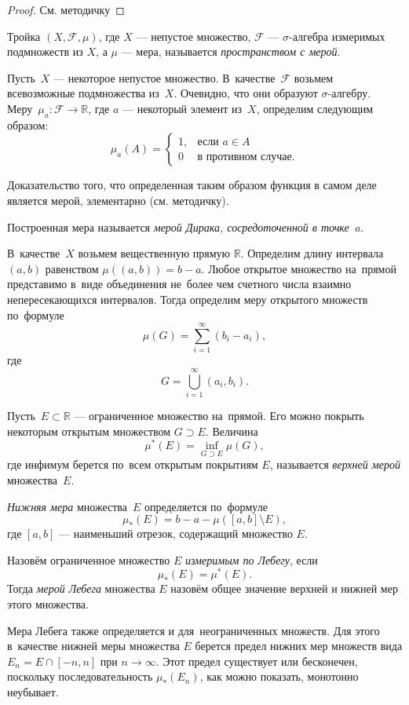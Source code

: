 \begin{proof}
    См. методичку
\end{proof}

\begin{definition}
    Тройка $(X, \mathcal F, \mu)$, где $X$ --- непустое множество, $\mathcal F$
    --- $\sigma$-алгебра измеримых подмножеств из $X$, а $\mu$ --- мера,
    называется \emph{пространством с мерой}.
\end{definition}

\begin{example}
    Пусть~$X$ --- некоторое непустое множество. В~качестве~$\mathcal F$
    возьмем всевозможные подмножества из~$X$. Очевидно, что они образуют
    $\sigma$-алгебру. Меру~$\mu_a \colon \mathcal F \to \mathbb R$, где 
    $a$ --- некоторый элемент из~$X$, определим следующим образом:
    \[ \mu_a(A) = 
        \begin{cases}
            1, & \text{если } a \in A \\
            0 & \text{в противном случае.}
    \end{cases} \]

    Доказательство того, что определенная таким образом функция в самом деле
    является мерой, элементарно (см. методичку).

    Построенная мера называется \emph{мерой Дирака, сосредоточенной в точке~$a$}.
\end{example}

\begin{example}
    В~качестве~$X$ возьмем вещественную прямую $\mathbb R$. Определим длину
    интервала~$(a, b)$ равенством $\mu( (a, b) ) = b - a$. Любое открытое
    множество на~прямой представимо в~виде объединения не~более чем счетного
    числа взаимно непересекающихся интервалов. Тогда определим меру
    открытого множеств по~формуле \[\mu(G) = \sum\limits_{i=1}^\infty (b_i -
    a_i),\] где 
    \[ G = \bigcup\limits_{i=1}^\infty (a_i, b_i). \]

    Пусть~$E \subset \mathbb R$ --- ограниченное множество на~прямой. Его можно
    покрыть некоторым открытым множеством $G \supset E$. Величина 
    \[ \mu^*(E) = \inf\limits_{G \supset E} \mu(G),\] 
    где инфимум берется по~всем открытым покрытиям
    $E$, называется \emph{верхней мерой} множества~$E$.

    \emph{Нижняя мера} множества~$E$ определяется по~формуле 
    \[ \mu_*(E) = b - a - \mu([a, b] \setminus E),\]
    где $[a, b]$ --- наименьший отрезок, содержащий множество $E$.

    Назовём ограниченное множество $E$ \emph{измеримым по Лебегу}, если 
    \[ \mu_*(E) = \mu^*(E).\]
    Тогда \emph{мерой Лебега} множества $E$ назовём общее значение
    верхней и нижней мер этого множества.

    Мера Лебега также определяется и для~неограниченных множеств. Для этого в~качестве
    нижней меры множества $E$ берется предел нижних мер множеств вида
    $E_n = E \cap [-n, n]$ при $n \to \infty$. Этот предел существует или бесконечен,
    поскольку последовательность $\mu_*(E_n)$, как можно показать, монотонно неубывает.
\end{example}

